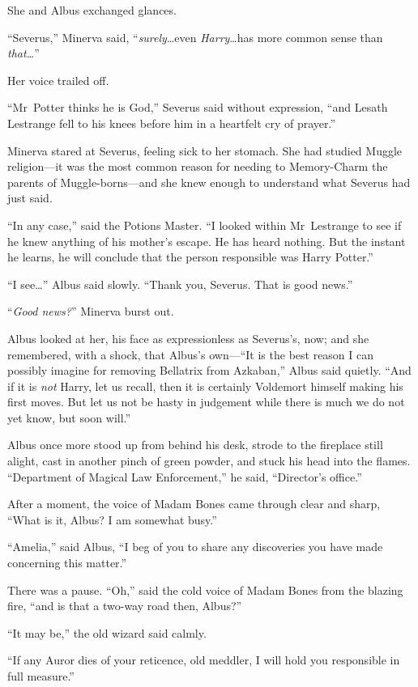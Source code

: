 She and Albus exchanged glances.

“Severus,” Minerva said, “\emph{surely}…even \emph{Harry}…has more common sense than \emph{that…}”

Her voice trailed off.

“Mr~Potter thinks he is God,” Severus said without expression, “and Lesath Lestrange fell to his knees before him in a heartfelt cry of prayer.”

Minerva stared at Severus, feeling sick to her stomach. She had studied Muggle religion—it was the most common reason for needing to Memory-Charm the parents of Muggle-borns—and she knew enough to understand what Severus had just said.

“In any case,” said the Potions Master.
“I looked within Mr~Lestrange to see if he knew anything of his mother’s escape. He has heard nothing. But the instant he learns, he will conclude that the person responsible was Harry Potter.”

“I see…” Albus said slowly.
“Thank you, Severus. That is good news.”

“\emph{Good news?}” Minerva burst out.

Albus looked at her, his face as expressionless as Severus’s, now; and she remembered, with a shock, that Albus’s own—“It is the best reason I can possibly imagine for removing Bellatrix from Azkaban,” Albus said quietly.
“And if it is \emph{not} Harry, let us recall, then it is certainly Voldemort himself making his first moves. But let us not be hasty in judgement while there is much we do not yet know, but soon will.”

Albus once more stood up from behind his desk, strode to the fireplace still alight, cast in another pinch of green powder, and stuck his head into the flames.
“Department of Magical Law Enforcement,” he said,
“Director’s office.”

After a moment, the voice of Madam Bones came through clear and sharp,
“What is it, Albus? I am somewhat busy.”

“Amelia,” said Albus,
“I beg of you to share any discoveries you have made concerning this matter.”

There was a pause.
“Oh,” said the cold voice of Madam Bones from the blazing fire, “and is that a two-way road then, Albus?”

“It may be,” the old wizard said calmly.

“If any Auror dies of your reticence, old meddler, I will hold you responsible in full measure.”

